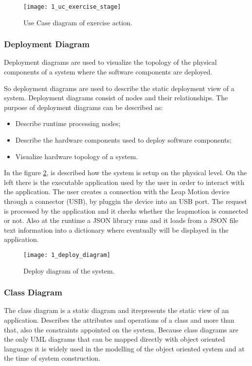\begin{figure}[!h]
\centering
\texttt{[image: 1\_uc\_exercise\_stage]}
\caption{Use Case diagram of exercise action.}\label{uc_exercise}
\end{figure}

\subsubsection{Deployment Diagram}
Deployment diagrams are used to visualize the topology of the physical components of a system where the software components are deployed.

So deployment diagrams are used to describe the static deployment view of a system. Deployment diagrams consist of nodes and their relationships. The purpose of deployment diagrams can be described as:
\begin{itemize}
\item Describe runtime processing nodes;
\item Describe the hardware components used to deploy software components;
\item Visualize hardware topology of a system.
\end{itemize}

\vspace{0.2cm}

In the \mbox{figure} \ref{deploy_diagram}, is described how the system is setup on the physical level. On the left there is the executable application used by the user in order to interact with the application. The user creates a connection with the Leap Motion device through a connector (USB), by pluggin the device into an USB port. The request is processed by the application and it checks whether the leapmotion is connected or not. Also at the runtime a JSON library runs and it loads from a JSON file text information into a dictionary where eventually will be displayed in the application.


\begin{figure}[!h]
\centering
\texttt{[image: 1\_deploy\_diagram]}
\caption{Deploy diagram of the system.}\label{deploy_diagram}
\end{figure}


\subsubsection{Class Diagram}
The class diagram is a static diagram and itrepresents the static view of an application. Describes the attributes and operations of a class and more than that, also the constraints appointed on the system.
Because class diagrams are the only UML diagrams that can be mapped directly with object oriented languages it is widely used in the modelling of the object oriented system and at the time of system construction.

